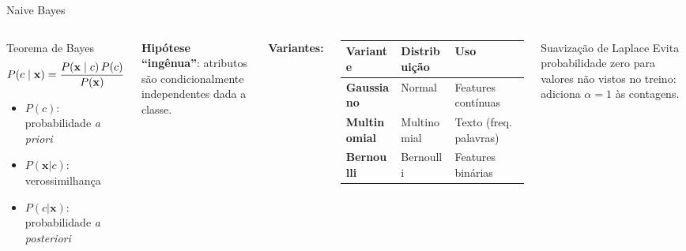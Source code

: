 \documentclass[aspectratio=169]{beamer}
\begin{document}
\begin{frame}{Naive Bayes}
\begin{columns}[T]
\begin{block}{Teorema de Bayes}
\vspace{0.3em}
\[\large P(c \mid \mathbf{x}) = \frac{P(\mathbf{x} \mid c)\, P(c)}{P(\mathbf{x})}\]
\vspace{0.1em}
\begin{itemize}
  \item $P(c)$: probabilidade \textit{a priori}
  \item $P(\mathbf{x}|c)$: verossimilhança
  \item $P(c|\mathbf{x})$: probabilidade \textit{a posteriori}
\end{itemize}
\end{block}
\vspace{0.3em}
\textbf{Hipótese ``ingênua''}: atributos são condicionalmente independentes dada a classe.

\textbf{Variantes:}
\vspace{0.3em}

\begin{tabular}{>{\bfseries\footnotesize}p{2.3cm}p{2.0cm}p{2.0cm}}
\toprule
Variante & Distribuição & Uso \\
\midrule
Gaussiano & Normal & Features contínuas \\[3pt]
Multinomial & Multinomial & Texto (freq. palavras) \\[3pt]
Bernoulli & Bernoulli & Features binárias \\[3pt]
\bottomrule
\end{tabular}
\vspace{0.4em}
\begin{alertblock}{Suavização de Laplace}
  Evita probabilidade zero para valores não vistos no treino: adiciona $\alpha=1$ às contagens.
\end{alertblock}
\end{columns}
\end{frame}
\end{document}
